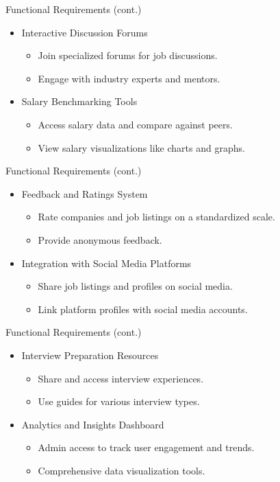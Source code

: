 \documentclass{beamer}
\begin{document}
\begin{frame}{Functional Requirements (cont.)}
    \begin{itemize}
        \item Interactive Discussion Forums
        \begin{itemize}
            \item Join specialized forums for job discussions.
            \item Engage with industry experts and mentors.
        \end{itemize}
        \item Salary Benchmarking Tools
        \begin{itemize}
            \item Access salary data and compare against peers.
            \item View salary visualizations like charts and graphs.
        \end{itemize}
    \end{itemize}
\end{frame}

\begin{frame}{Functional Requirements (cont.)}
    \begin{itemize}
        \item Feedback and Ratings System
        \begin{itemize}
            \item Rate companies and job listings on a standardized scale.
            \item Provide anonymous feedback.
        \end{itemize}
        \item Integration with Social Media Platforms
        \begin{itemize}
            \item Share job listings and profiles on social media.
            \item Link platform profiles with social media accounts.
        \end{itemize}
    \end{itemize}
\end{frame}

\begin{frame}{Functional Requirements (cont.)}
    \begin{itemize}
        \item Interview Preparation Resources
        \begin{itemize}
            \item Share and access interview experiences.
            \item Use guides for various interview types.
        \end{itemize}
        \item Analytics and Insights Dashboard
        \begin{itemize}
            \item Admin access to track user engagement and trends.
            \item Comprehensive data visualization tools.
        \end{itemize}
    \end{itemize}
\end{frame}
\end{document}
